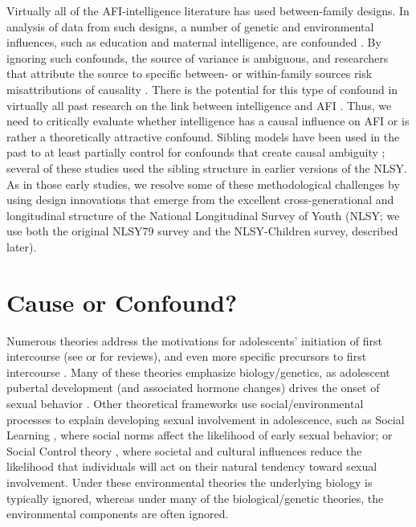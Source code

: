 \documentclass[a4paper,man,apacite,natbib,12pt,longtable]{apa6}\usepackage[]{graphicx}\usepackage[]{color}
\begin{document}
Virtually all of the AFI-intelligence literature has used between-family designs. In analysis of data from such designs, a number of genetic and environmental influences, such as education and maternal intelligence, are confounded \citep{DOnofrio2013,harden2014genetic,Lahey2010,Rodgers2000}. By ignoring such confounds, the source of variance is ambiguous, and researchers that attribute the source to specific between- or within-family sources risk misattributions of causality \citep{Rowe1997,Rutter2007}. There is the potential for this type of confound in virtually all past research on the link between intelligence and AFI \citep{harden2011don,harden2014genetic,plomin2004intelligence,rodgers1999nature,rodgers1994df}. Thus, we need to critically evaluate whether intelligence has a causal influence on AFI or is rather a theoretically attractive confound. Sibling models have been used in the past to at least partially control for confounds that create causal ambiguity \citep[\eg][]{east1996younger,east1993sisters,geronimus1992socioeconomic,rodgers1990adolescent,rodgers1992sibling};  several of these studies used the sibling structure in earlier versions of the NLSY.  As in those early studies, we resolve some of these methodological challenges by using design innovations that emerge from the excellent cross-generational and longitudinal structure of the National Longitudinal Survey of Youth (NLSY; we use both the original NLSY79 survey and the NLSY-Children survey, described later).
%
\section{Cause or Confound?}
Numerous theories address the motivations for adolescents' initiation of first intercourse (see \citealp{Rodgers1996} or \citealp{Buhi2007} for reviews), and even more specific precursors to first intercourse \citep{Buhi2007,DOnofrio2010,kirby2002antecedents,miller1997timing,santelli1992risk}. Many of these theories emphasize biology/genetics, as adolescent pubertal development (and associated hormone changes) drives the onset of sexual behavior \citep{miller1999dopamine,udry1979age,udry1994nature}. Other theoretical frameworks use social/environmental processes to explain developing sexual involvement in adolescence, such as Social Learning \citep{diblasio1990adolescent,hogben1998using}, where social norms affect the likelihood of early sexual behavior; or Social Control theory \citep{hirschi2002causes}, where societal and cultural influences reduce the likelihood that individuals will act on their natural tendency toward sexual involvement. Under these environmental theories the underlying biology is typically ignored, whereas under many of the biological/genetic theories, the environmental components are often ignored.
\end{document}
